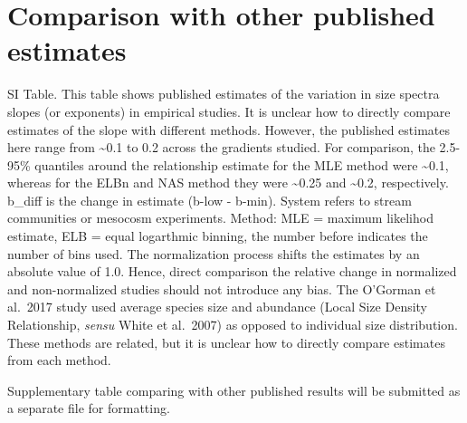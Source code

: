 \documentclass[
]{article}
\begin{document}
\hypertarget{comparison-with-other-published-estimates}{%
\section{Comparison with other published
estimates}\label{comparison-with-other-published-estimates}}

SI Table. This table shows published estimates of the variation in size
spectra slopes (or exponents) in empirical studies. It is unclear how to
directly compare estimates of the slope with different methods. However,
the published estimates here range from \textasciitilde0.1 to 0.2 across
the gradients studied. For comparison, the 2.5-95\% quantiles around the
relationship estimate for the MLE method were \textasciitilde0.1,
whereas for the ELBn and NAS method they were \textasciitilde0.25 and
\textasciitilde0.2, respectively. b\_diff is the change in estimate
(b-low - b-min). System refers to stream communities or mesocosm
experiments. Method: MLE = maximum likelihod estimate, ELB = equal
logarthmic binning, the number before indicates the number of bins used.
The normalization process shifts the estimates by an absolute value of
1.0. Hence, direct comparison the relative change in normalized and
non-normalized studies should not introduce any bias. The O'Gorman et
al.~2017 study used average species size and abundance (Local Size
Density Relationship, \emph{sensu} White et al.~2007) as opposed to
individual size distribution. These methods are related, but it is
unclear how to directly compare estimates from each method.

Supplementary table comparing with other published results will be
submitted as a separate file for formatting.
\end{document}
